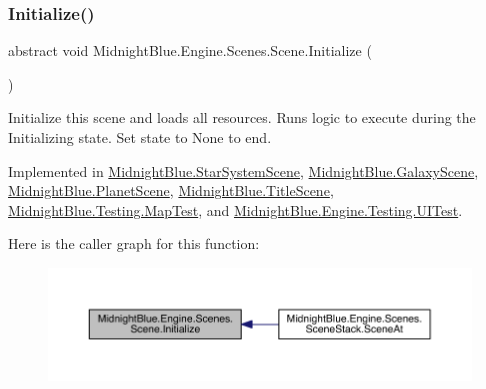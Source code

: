 \hypertarget{class_midnight_blue_1_1_engine_1_1_scenes_1_1_scene_aa919101862c14384b955d91a4d3362ab}{}\label{class_midnight_blue_1_1_engine_1_1_scenes_1_1_scene_aa919101862c14384b955d91a4d3362ab} 
\subsubsection{\texorpdfstring{Initialize()}{Initialize()}}
{\footnotesize\ttfamily abstract void Midnight\+Blue.\+Engine.\+Scenes.\+Scene.\+Initialize (\begin{DoxyParamCaption}{ }\end{DoxyParamCaption})\hspace{0.3cm}{\ttfamily [pure virtual]}}



Initialize this scene and loads all resources. Runs logic to execute during the Initializing state. Set state to None to end. 



Implemented in \hyperlink{class_midnight_blue_1_1_star_system_scene_a1b593cd45d0f1b6c02f17ec5dd1033ca}{Midnight\+Blue.\+Star\+System\+Scene}, \hyperlink{class_midnight_blue_1_1_galaxy_scene_a97d97e56a73d9a4b7caf6dd6ce86647e}{Midnight\+Blue.\+Galaxy\+Scene}, \hyperlink{class_midnight_blue_1_1_planet_scene_ac8b7e88283b22b87aa45f116b549e86f}{Midnight\+Blue.\+Planet\+Scene}, \hyperlink{class_midnight_blue_1_1_title_scene_a793aa8253fba8d62a4ee19f042b22891}{Midnight\+Blue.\+Title\+Scene}, \hyperlink{class_midnight_blue_1_1_testing_1_1_map_test_adcaa2f37efbf5764b48d297cabf17784}{Midnight\+Blue.\+Testing.\+Map\+Test}, and \hyperlink{class_midnight_blue_1_1_engine_1_1_testing_1_1_u_i_test_ad2b7f129febf8658c10c7881af15c847}{Midnight\+Blue.\+Engine.\+Testing.\+U\+I\+Test}.

Here is the caller graph for this function\+:
\nopagebreak
\begin{figure}[H]
\begin{center}
\leavevmode
\includegraphics[width=350pt]{class_midnight_blue_1_1_engine_1_1_scenes_1_1_scene_aa919101862c14384b955d91a4d3362ab_icgraph}
\end{center}
\end{figure}
\hypertarget{class_midnight_blue_1_1_engine_1_1_scenes_1_1_scene_aeb3c4d9bea0177d21fbffcdabab660de}{}\label{class_midnight_blue_1_1_engine_1_1_scenes_1_1_scene_aeb3c4d9bea0177d21fbffcdabab660de} 
